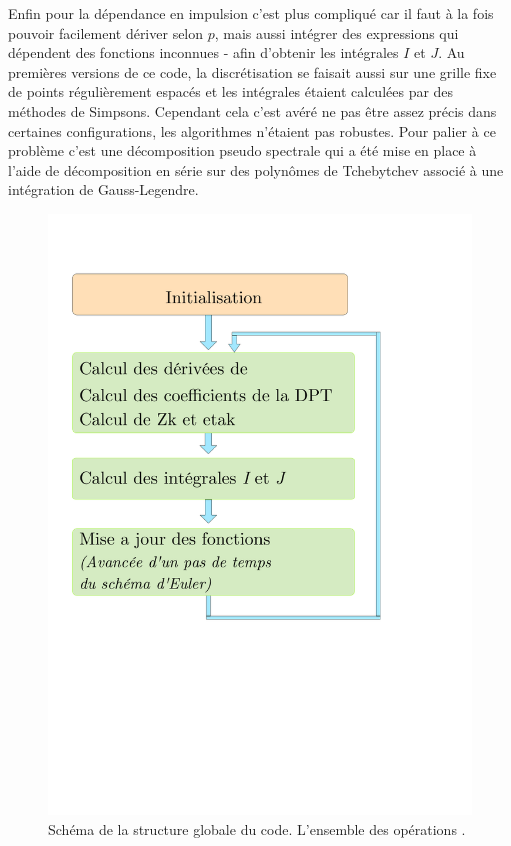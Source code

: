 \documentclass[10pt]{article}
\begin{document}
\begin{multicols}{2}
Enfin pour la dépendance en impulsion c'est plus compliqué car il faut à la fois pouvoir facilement dériver selon $p$, mais aussi intégrer des expressions qui dépendent des fonctions inconnues - afin d'obtenir les intégrales $I$ et $J$. Au premières versions de ce code, la discrétisation se faisait aussi sur une grille fixe de points régulièrement espacés et les intégrales étaient calculées par des méthodes de Simpsons. Cependant cela c'est avéré ne pas être assez précis dans certaines configurations, les algorithmes n'étaient pas robustes. Pour palier à ce problème c'est une décomposition pseudo spectrale qui a été mise en place à l'aide de décomposition en série sur des polynômes de Tchebytchev associé à une intégration de Gauss-Legendre. 

\begin{figure}[H]
	\begin{center}
		\includegraphics[scale = 0.7]{Diagramme_Code.pdf}
		\caption{Schéma de la structure globale du code. L'ensemble des opérations .}
		\label{figPhoto1}
	\end{center}
\end{figure}



\end{multicols}
\end{document}
